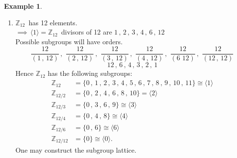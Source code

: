 \documentclass[11pt,a4paper]{article}
\theoremstyle{definition}
\newtheorem{exa}[thm]{Example}
\begin{document}
\begin{exa}
\begin{enumerate}
\item $\mathbb{Z}_{12}\, $ has 12 elements.\\
$\implies\, \langle 1\rangle = \mathbb{Z}_{12}\,$ divisors of 12 are $1\, , \, 2\,,\, 3\, , \, 4\, ,\, 6\, , \, 12$\\

Possible subgroups will have orders.
$$\dfrac{12}{(1\, , \, 12)}\, , \, \, \dfrac{12}{(2\, , \, 12)}\, , \,\, \dfrac{12}{(3\, , \, 12)}\, ,\, \, \dfrac{12}{(4\, , \, 12)}\, , \,\, \dfrac{12}{(6\,\, 12)}\, , \, \, \dfrac{12}{(12\, ,\, 12)}$$
$$12\, , \, 6\, ,\, 4\, , \, 3\,,\, 2\, , \, 1$$
Hence $\mathbb{Z}_{12}$ has the following subgroups:
\begin{align*}
\mathbb{Z}_{12} & = \{0\, , \, 1\, , \, 2\, ,\, 3\,, \, 4\, , \, 5\, , \, 6\, , \, 7\, , \, 8\, , \, 9\, , \, 10\, , \, 11\}\cong \langle 1\rangle\\
\mathbb{Z}_{12/2} & = \{0\, , \, 2\, , \, 4\, , \, 6\, , \, 8\, , \, 10\}  = \langle 2\rangle\\
\mathbb{Z}_{12/3} & = \{0\, , \, 3\, , \, 6\, , \, 9\} \cong \langle 3\rangle\\
\mathbb{Z}_{12/4} & = \{0\, , \, 4\, , \, 8\} \cong \langle 4\rangle\\
\mathbb{Z}_{12/6} & = \{0\, ,\, 6\} \cong \langle 6\rangle\\
\mathbb{Z}_{12/12} & = \{0\} \cong \langle 0\rangle.
\end{align*}
One may construct the subgroup lattice.




\begin{figure}[H]
\centering
{}
\end{figure}




















\end{enumerate}
\end{exa}
\end{document}
